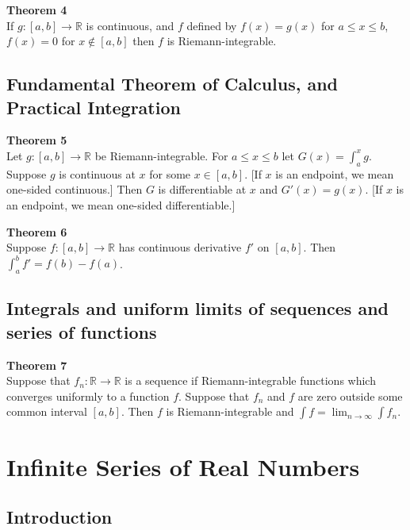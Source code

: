 \documentclass[8pt,landscape]{article}
\begin{document}
\begin{multicols}{3}
    \textbf{Theorem 4} \\
    If $g : [a, b] \to \mathbb{R}$ is continuous, and $f$ defined by $f(x) = g(x)$
    for $a \leq x \leq b$, $f(x) = 0$ for $x \notin [a, b]$ then $f$ is Riemann-integrable.

    \subsection{Fundamental Theorem of Calculus, and Practical Integration}

    \textbf{Theorem 5} \\
    Let $g : [a, b] \to \mathbb{R}$ be Riemann-integrable.
    For $a \leq x \leq b$ let $G(x) = \int_a^x g$.
    Suppose $g$ is continuous at $x$ for some $x \in [a, b]$.
    [If $x$ is an endpoint, we mean one-sided continuous.]
    Then $G$ is differentiable at $x$ and $G'(x) = g(x)$.
    [If $x$ is an endpoint, we mean one-sided differentiable.]

    \textbf{Theorem 6} \\
    Suppose $f : [a, b] \to \mathbb{R}$ has continuous derivative $f'$ on $[a, b]$.
    Then
    $\int_a^b f' = f(b) - f(a)$.

    \subsection{Integrals and uniform limits of sequences and series of functions}

    \textbf{Theorem 7} \\
    Suppose that $f_n : \mathbb{R} \to \mathbb{R}$ is a sequence if Riemann-integrable
    functions which converges uniformly to a function $f$.
    Suppose that $f_n$ and $f$ are zero outside some common interval $[a, b]$.
    Then $f$ is Riemann-integrable and
    $\int f = \lim_{n \to \infty} \int f_n$.

    \section{Infinite Series of Real Numbers}

    \subsection{Introduction}


\end{multicols}
\end{document}
